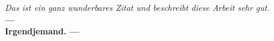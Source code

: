 \pagestyle{empty}
\vspace*{\fill}
\begin{center}
	\huge{
	\glqq
	\textit{Das ist ein ganz wunderbares Zitat und beschreibt diese Arbeit sehr gut.}\grqq\\
	\textbf{--- \\ Irgendjemand. ---}
	}
\end{center}

\vfill

\newpage
\pagestyle{fancy}